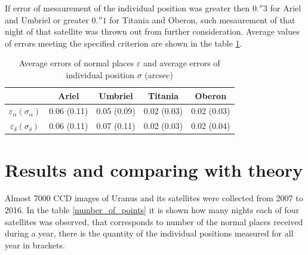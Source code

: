 \documentclass[]{article}
\begin{document}
If error of mesaurement of the individual position was greater then $0.''3$ for Ariel and Umbriel or greater $0.''1$ for Titania and Oberon, such mesaurement of that night of that satellite was thrown out from further consideration. Average values of errors meeting the specified criterion are shown in the table \ref{errors}.\par
\begin{table}[h!]
\caption{Average errors of normal places $\varepsilon$ and average errors of individual position $\sigma$ (arcsec)}
\label{errors}
\begin{center}
\begin{tabular}{|c|c|c|c|c|}
\hline
&Ariel&Umbriel&Titania&Oberon \\
\hline
$\varepsilon_\alpha (\sigma_\alpha)$&0.06 (0.11)&0.05 (0.09)&0.02 (0.03)&0.02 (0.03) \\
$\varepsilon_\delta (\sigma_\delta)$&0.06 (0.11)&0.07 (0.11)&0.02 (0.03)&0.02 (0.04) \\
\hline
\end{tabular}
\end{center}
\end{table}



\section{Results and comparing with theory}
Almost 7000 CCD images of Uranus and its satellites were collected from 2007 to 2016. In the table \ref{number_of_points} it is shown how many nights each of four satellites was observed, that corresponds to number of the normal places received during a year, there is the quantity of the individual positions measured for all year in brackets.\par
\end{document}
